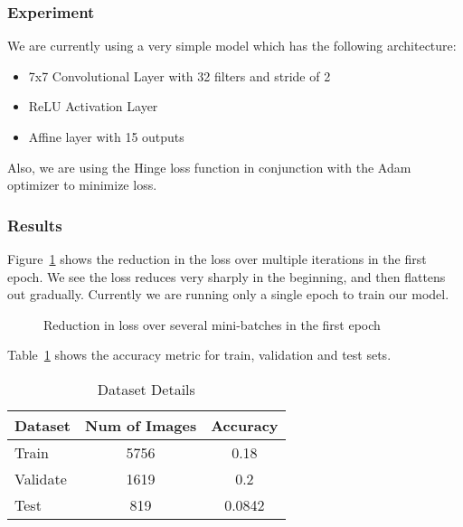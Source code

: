 \subsubsection{Experiment}
\label{subsubsec:pb1experiment}

We are currently using a very simple model which has the following architecture:

\begin{itemize}[noitemsep]
\item 7x7 Convolutional Layer with 32 filters and stride of 2
\item ReLU Activation Layer
\item Affine layer with 15 outputs
\end{itemize}

Also, we are using the Hinge loss function in conjunction with the Adam optimizer to minimize loss.

\subsubsection{Results}
\label{subsubsec:pb1results}

Figure~\ref{fig:lossepoch1} shows the reduction in the loss over multiple iterations in the first epoch. We see the loss reduces very sharply in the beginning, and then flattens out gradually.  Currently we are running only a single epoch to train our model.  

\begin{figure}[h!]
\centering
  \caption{Reduction in loss over several mini-batches in the first epoch}
  \label{fig:lossepoch1}
\end{figure}


Table~\ref{table:classificationresults} shows the accuracy metric for train, validation and test sets.

\begin{table}
\begin{center}
\begin{tabular}{|l|c|c|}
\hline
Dataset & Num of Images & Accuracy \\
\hline\hline
Train & 5756 & 0.18 \\
Validate & 1619 & 0.2 \\
Test & 819 & 0.0842 \\
\hline
\end{tabular}
\end{center}
\caption{Dataset Details}
\label{table:classificationresults}
\end{table}


